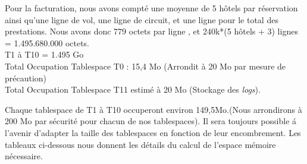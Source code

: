 Pour la facturation, nous avons compt\'e une moyenne de 5 h\^otels par r\'eservation ainsi qu'une ligne de vol, une ligne de circuit, et une ligne pour le total des prestations. Nous avons donc 779 octets par ligne , et 240k*(5 h\^otels + 3) lignes = 1.495.680.000 octets.\\
T1 \`a T10 = 1.495 Go\\
Total Occupation Tablespace T0 : 15,4 Mo (Arrondit à 20 Mo par mesure de pr\'ecaution)\\
Total Occupation Tablespace T11 estim\'e \`a 20 Mo (Stockage des \textit{logs}).

Chaque tablespace de T1 \`a T10 occuperont environ 149,5Mo.(Nous arrondirons \`a 200 Mo par s\'ecurit\'e pour chacun de nos tablespaces).
Il sera toujours possible \'a l'avenir d'adapter la taille des tablespaces en fonction de leur encombrement.
Les tableaux ci-dessous nous donnent les d\'etails du calcul de l'espace m\'emoire n\'ecessaire.

\newpage



